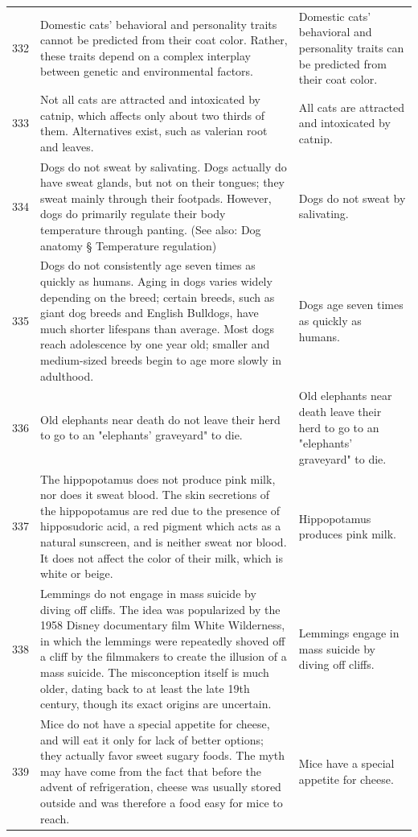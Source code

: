 \begin{tabular}{c|p{}|p{}}
332 & Domestic cats' behavioral and personality traits cannot be predicted from their coat color. Rather, these traits depend on a complex interplay between genetic and environmental factors. & Domestic cats' behavioral and personality traits can be predicted from their coat color. \\
333 & Not all cats are attracted and intoxicated by catnip, which affects only about two thirds of them. Alternatives exist, such as valerian root and leaves. & All cats are attracted and intoxicated by catnip. \\
334 & Dogs do not sweat by salivating. Dogs actually do have sweat glands, but not on their tongues; they sweat mainly through their footpads. However, dogs do primarily regulate their body temperature through panting. (See also: Dog anatomy § Temperature regulation) & Dogs do not sweat by salivating. \\
335 & Dogs do not consistently age seven times as quickly as humans. Aging in dogs varies widely depending on the breed; certain breeds, such as giant dog breeds and English Bulldogs, have much shorter lifespans than average. Most dogs reach adolescence by one year old; smaller and medium-sized breeds begin to age more slowly in adulthood. & Dogs age seven times as quickly as humans. \\
336 & Old elephants near death do not leave their herd to go to an "elephants' graveyard" to die. & Old elephants near death leave their herd to go to an "elephants' graveyard" to die. \\
337 & The hippopotamus does not produce pink milk, nor does it sweat blood. The skin secretions of the hippopotamus are red due to the presence of hipposudoric acid, a red pigment which acts as a natural sunscreen, and is neither sweat nor blood. It does not affect the color of their milk, which is white or beige. & Hippopotamus produces pink milk. \\
338 & Lemmings do not engage in mass suicide by diving off cliffs. The idea was popularized by the 1958 Disney documentary film White Wilderness, in which the lemmings were repeatedly shoved off a cliff by the filmmakers to create the illusion of a mass suicide. The misconception itself is much older, dating back to at least the late 19th century, though its exact origins are uncertain. & Lemmings engage in mass suicide by diving off cliffs. \\
339 & Mice do not have a special appetite for cheese, and will eat it only for lack of better options; they actually favor sweet sugary foods. The myth may have come from the fact that before the advent of refrigeration, cheese was usually stored outside and was therefore a food easy for mice to reach. & Mice have a special appetite for cheese. \\

\end{tabular}
